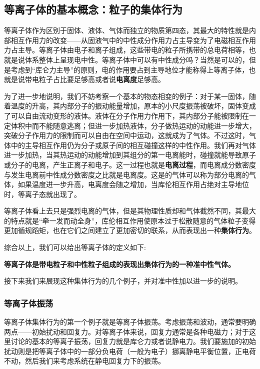 
\subsection{等离子体的基本概念：粒子的集体行为}

等离子体作为区别于固体、液体、气体而独立的物质第四态，其最大的特性就是内部相互作用力的改变——从固液气中的中性成分作用力占主导变为了电磁相互作用力占主导。等离子体由电子和离子组成，这些带电的粒子所携带的总电荷相等，也就是说体系整体上呈现电中性。等离子体中可以有中性成分吗？当然是可以的，但是考虑到“库仑力主导”的原则，电的作用要占到主导地位才能称得上等离子体，也就是说带电粒子占比要足够高或者说\textbf{电离度}足够高。

为了进一步地说明，我们不妨考察一个基本的物态相变的例子：对于某一固体，随着温度的升高，其内部分子的振动能量增加，原本的小尺度振荡被破坏，固体变成了可以自由流动变形的液体。液体在分子作用力作用下，其内部分子能被限制在一定体积中而不能随意逃离；但进一步加热液体，分子做热运动的动能进一步增大，突破分子作用力的限制而可以自由在空间中运动，这就成为了气体。不过这时，气体中的主导相互作用仍为分子或原子间的相互碰撞这样的中性作用。我们再对气体进一步加热，当其热运动的动能增加到其组分的第一电离能时，碰撞就能导致原子或分子的电离，产生正离子和电子。这一过程也就是\textbf{电离过程}，而电离成分数密度与发生电离前中性成分数密度之比就是电离度。这是的气体可以称为部分电离的气体，如果温度进一步升高，电离度会随之增加，当库伦相互作用占绝对主导地位时，等离子态就出现了。

等离子体看上去只是强烈电离的气体，但是其物理性质却和气体截然不同，其最大的特点就是“牵一发而动全身”，库伦相互作用使原本过于松散随意的气体粒子变得更加循规蹈矩，也在它们之间建立了更加密切的联系，从而表现出一种\textbf{集体行为}。

综合以上，我们可以给出等离子体的定义如下:

\textbf{等离子体是带电粒子和中性粒子组成的表现出集体行为的一种准中性气体。}

接下来我们来展现这种集体行为的几个例子，并对准中性加以进一步的说明。

\subsubsection{等离子体振荡}

等离子体集体行为的第一个例子就是等离子体振荡。考虑振荡和波动，通常要明确两点——初始扰动和回复力。对等离子体来说，回复力通常是各种电磁力；对于这里讨论的基本的等离子振荡，回复力就是库仑力或者说静电力。我们要施加的初始扰动则是把等离子体中的一部分负电荷（一般为电子）挪离静电平衡位置，正电荷不动，然后我们来考虑系统在静电回复力下的振荡。

